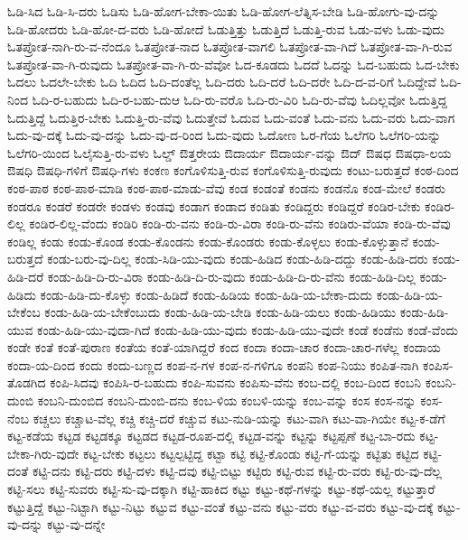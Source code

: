 {ಓಡಿ-ಸಿದ
ಓಡಿ-ಸಿ-ದರು
ಓಡಿಸು
ಓಡಿ-ಹೋಗ-ಬೇಕಾ-ಯಿತು
ಓಡಿ-ಹೋಗ-ಲೆತ್ನಿಸ-ಬೇಡಿ
ಓಡಿ-ಹೋಗು-ವು-ದನ್ನು
ಓಡಿ-ಹೋದರು
ಓಡಿ-ಹೋ-ದ-ವರು
ಓಡಿ-ಹೋದೆ
ಓಡುತ್ತಿತ್ತು
ಓಡುತ್ತಿದೆ
ಓಡುತ್ತಿ-ರುವ
ಓಡು-ವಳು
ಓಡು-ವುದು
ಓತಪ್ರೋತ-ನಾಗಿ-ರು-ವ-ನೆಂದೂ
ಓತಪ್ರೋತ-ನಾದ
ಓತಪ್ರೋತ-ವಾಗಲಿ
ಓತಪ್ರೋತ-ವಾ-ಗಿದೆ
ಓತಪ್ರೋತ-ವಾ-ಗಿ-ರುವ
ಓತಪ್ರೋತ-ವಾ-ಗಿ-ರುವುದು
ಓತಪ್ರೋತ-ವಾ-ಗಿ-ರು-ವೆವೋ
ಓದ-ಕೂಡದು
ಓದದೆ
ಓದನ್ನು
ಓದ-ಬಹುದು
ಓದ-ಬೇಕು
ಓದಲು
ಓದಲೇ-ಬೇಕು
ಓದಿ
ಓದಿದ
ಓದಿ-ದಂತೆಲ್ಲ
ಓದಿ-ದರು
ಓದಿ-ದರೆ
ಓದಿ-ದರೇ
ಓದಿ-ದ-ವ-ರಿಗೆ
ಓದಿದ್ದೇವೆ
ಓದಿ-ನಿಂದ
ಓದಿ-ರ-ಬಹುದು
ಓದಿ-ರ-ಬಹು-ದುಆ
ಓದಿ-ರು-ವರೊ
ಓದಿ-ರು-ವಿರಿ
ಓದಿ-ರು-ವೆವು
ಓದಿಲ್ಲವೋ
ಓದುತ್ತಿದ್ದ
ಓದುತ್ತಿದ್ದೆ
ಓದುತ್ತಿರ-ಬೇಕು
ಓದುತ್ತಿ-ರು-ವೆವು
ಓದುತ್ತೇವೆ
ಓದುವ
ಓದು-ವಂತೆ
ಓದು-ವನು
ಓದು-ವರು
ಓದು-ವಾಗ
ಓದು-ವು-ದಕ್ಕೆ
ಓದು-ವು-ದನ್ನು
ಓದು-ವು-ದ-ರಿಂದ
ಓದು-ವುದು
ಓದೋಣ
ಓರ-ಗೆಯ
ಓಲೆಗರಿ
ಓಲೆಗರಿ-ಯನ್ನು
ಓಲೆಗರಿ-ಯಿಂದ
ಓಲೈಸುತ್ತಿ-ರು-ವಳು
ಓಲ್ಡ್
ಔತ್ತರೇಯ
ಔದಾರ್ಯ
ಔದಾರ್ಯ-ವನ್ನು
ಔದ್
ಔಷಧ
ಔಷಧಾ-ಲಯ
ಔಷಧಿ
ಔಷಧಿ-ಗಳಿಗೆ
ಔಷಧಿ-ಗಳು
ಕಂಕಣ
ಕಂಗೊಳಿಸುತ್ತಿ-ರುವ
ಕಂಗೊಳಿಸುತ್ತಿ-ರುವುದು
ಕಂಟು-ಬರುತ್ತದೆ
ಕಂಠ-ದಿಂದ
ಕಂಠ-ಪಾಠ
ಕಂಠ-ಪಾಠ-ಮಾಡಿ
ಕಂಠ-ಪಾಠ-ಮಾಡು-ವೆವು
ಕಂಡ
ಕಂಡಂತೆ
ಕಂಡನು
ಕಂಡನೊ
ಕಂಡ-ಮೇಲೆ
ಕಂಡರು
ಕಂಡರೂ
ಕಂಡರೆ
ಕಂಡರೇ
ಕಂಡಳು
ಕಂಡವು
ಕಂಡಾಗ
ಕಂಡಾದ
ಕಂಡಿತು
ಕಂಡಿದ್ದರು
ಕಂಡಿದ್ದರೆ
ಕಂಡಿರ-ಬೇಕು
ಕಂಡಿರ-ಲಿಲ್ಲ
ಕಂಡಿರ-ಲಿಲ್ಲ-ವೆಂದು
ಕಂಡಿರಿ
ಕಂಡಿ-ರು-ವನು
ಕಂಡಿ-ರು-ವಿರಾ
ಕಂಡಿ-ರು-ವೆನು
ಕಂಡಿರು-ವೆಯಾ
ಕಂಡಿ-ರು-ವೆವು
ಕಂಡಿಲ್ಲ
ಕಂಡು
ಕಂಡು-ಕೊಂಡ
ಕಂಡು-ಕೊಂಡನು
ಕಂಡು-ಕೊಂಡರು
ಕಂಡು-ಕೊಳ್ಳಲು
ಕಂಡು-ಕೊಳ್ಳುತ್ತಾನೆ
ಕಂಡು-ಬರುತ್ತದೆ
ಕಂಡು-ಬರು-ವು-ದಿಲ್ಲ
ಕಂಡು-ಸಿಡಿ-ಯು-ವುದು
ಕಂಡು-ಹಿಡಿದ
ಕಂಡು-ಹಿಡಿ-ದದ್ದು
ಕಂಡು-ಹಿಡಿ-ದರು
ಕಂಡು-ಹಿಡಿ-ದರೆ
ಕಂಡು-ಹಿಡಿ-ದಿ-ರು-ವಿರಾ
ಕಂಡು-ಹಿಡಿ-ದಿ-ರು-ವುದು
ಕಂಡು-ಹಿಡಿ-ದಿ-ರು-ವೆನು
ಕಂಡು-ಹಿಡಿ-ದಿಲ್ಲ
ಕಂಡು-ಹಿಡಿದು
ಕಂಡು-ಹಿಡಿ-ದು-ಕೊಳ್ಳು
ಕಂಡು-ಹಿಡಿದೆ
ಕಂಡು-ಹಿಡಿಯ
ಕಂಡು-ಹಿಡಿ-ಯ-ಬೇಕಾ-ದುದು
ಕಂಡು-ಹಿಡಿ-ಯ-ಬೇಕೆಂಬ
ಕಂಡು-ಹಿಡಿ-ಯ-ಬೇಕೆಂಬುದು
ಕಂಡು-ಹಿಡಿ-ಯ-ಬೇಡಿ
ಕಂಡು-ಹಿಡಿ-ಯಲು
ಕಂಡು-ಹಿಡಿಯು
ಕಂಡು-ಹಿಡಿ-ಯುವ
ಕಂಡು-ಹಿಡಿ-ಯು-ವುದಾ-ಗಿದೆ
ಕಂಡು-ಹಿಡಿ-ಯು-ವುದು
ಕಂಡು-ಹಿಡಿ-ಯು-ವುದೇ
ಕಂಡೆ
ಕಂಡೆನು
ಕಂಡೆ-ವೆಂದು
ಕಂಡೇ
ಕಂತೆ
ಕಂತೆ-ಪುರಾಣ
ಕಂತೆಯ
ಕಂತೆ-ಯಾಗಿದ್ದರೆ
ಕಂದ
ಕಂದಾ
ಕಂದಾ-ಚಾರ
ಕಂದಾ-ಚಾರ-ಗಳೆಲ್ಲ
ಕಂದಾಯ
ಕಂದಾ-ಯ-ದಿಂದ
ಕಂದು
ಕಂದು-ಬಣ್ಣದ
ಕಂಪ-ನ-ಗಳ
ಕಂಪ-ನ-ಗಳಿಗೂ
ಕಂಪನಿ
ಕಂಪ-ನಿಯು
ಕಂಪಿತ-ನಾಗಿ
ಕಂಪಿಸ-ತೊಡಗಿದ
ಕಂಪಿ-ಸಿದವು
ಕಂಪಿಸಿ-ರ-ಬಹುದು
ಕಂಪಿ-ಸುವನು
ಕಂಪಿಸು-ವೆನು
ಕಂಬ-ದಲ್ಲಿ
ಕಂಬ-ದಿಂದ
ಕಂಬನಿ
ಕಂಬನಿ-ದುಂಬಿ
ಕಂಬನಿ-ದುಂಬಿದ
ಕಂಬನಿ-ದುಂಬಿ-ದನು
ಕಂಬ-ಳಿಯ
ಕಂಬಳಿ-ಯನ್ನು
ಕಂಬ-ವನ್ನು
ಕಂಸ
ಕಂಸ-ನನ್ನು
ಕಂಸ-ನೆಂಬ
ಕಚ್ಚಲು
ಕಚ್ಚಾಟ-ವೆಲ್ಲ
ಕಚ್ಚಿ
ಕಚ್ಚಿ-ದರೆ
ಕಚ್ಚುವ
ಕಟು-ನುಡಿ-ಯನ್ನು
ಕಟು-ವಾಗಿ
ಕಟು-ವಾ-ಗಿಯೇ
ಕಟ್ಟ-ಕ-ಡೆಗೆ
ಕಟ್ಟ-ಕಡೆಯ
ಕಟ್ಟಡ
ಕಟ್ಟಡಕ್ಕೂ
ಕಟ್ಟಡದ
ಕಟ್ಟಡ-ರೂಪ-ದಲ್ಲಿ
ಕಟ್ಟಡ-ವನ್ನು
ಕಟ್ಟನ್ನು
ಕಟ್ಟಪ್ಪಣೆ
ಕಟ್ಟ-ಬಾ-ರದು
ಕಟ್ಟ-ಬೇಕಾ-ಗಿರು-ವುದೇ
ಕಟ್ಟ-ಬೇಕು
ಕಟ್ಟಲು
ಕಟ್ಟಲ್ಪಟ್ಟಿದ್ದ
ಕಟ್ಟಾ
ಕಟ್ಟಿ
ಕಟ್ಟಿ-ಕೊಂಡು
ಕಟ್ಟಿ-ಗೆ-ಯನ್ನು
ಕಟ್ಟಿತು
ಕಟ್ಟಿದ
ಕಟ್ಟಿ-ದಂತೆ
ಕಟ್ಟಿ-ದನು
ಕಟ್ಟಿ-ದರು
ಕಟ್ಟಿ-ದಳು
ಕಟ್ಟಿ-ದವು
ಕಟ್ಟಿ-ಬಿಟ್ಟು
ಕಟ್ಟಿರು
ಕಟ್ಟಿ-ರುವ
ಕಟ್ಟಿ-ರು-ವರು
ಕಟ್ಟಿ-ರು-ವು-ದೆಲ್ಲ
ಕಟ್ಟಿ-ಸಲು
ಕಟ್ಟಿ-ಸುವರು
ಕಟ್ಟಿ-ಸು-ವು-ದಕ್ಕಾಗಿ
ಕಟ್ಟಿ-ಹಾಕಿದ
ಕಟ್ಟು
ಕಟ್ಟು-ಕಥೆ-ಗಳನ್ನು
ಕಟ್ಟು-ಕಥೆ-ಯಲ್ಲ
ಕಟ್ಟುತ್ತಾರೆ
ಕಟ್ಟುತ್ತಿದ್ದೆ
ಕಟ್ಟು-ನಿಟ್ಟಾಗಿ
ಕಟ್ಟು-ನಿಟ್ಟು
ಕಟ್ಟುವ
ಕಟ್ಟು-ವಂತೆ
ಕಟ್ಟು-ವನು
ಕಟ್ಟು-ವರು
ಕಟ್ಟು-ವ-ವರು
ಕಟ್ಟು-ವು-ದಕ್ಕೆ
ಕಟ್ಟು-ವು-ದನ್ನು
ಕಟ್ಟು-ವು-ದನ್ನೇ
}
